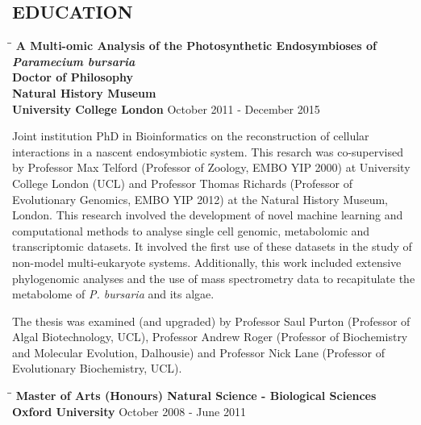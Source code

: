 \documentclass{res}
\begin{document}
\begin{resume}
        
\section{EDUCATION}          

\vspace{-0.05in}
\begin{tabbing}
   \hspace{2in}\= \hspace{2.6in}\= \kill 
   {\bf A Multi-omic Analysis of the Photosynthetic Endosymbioses of \textit{Paramecium bursaria}}\\
    {\bf Doctor of Philosophy}\\ 
    {\bf Natural History Museum}\\
    {\bf University College London
    } \>      \>October 2011 - December 2015\\

   \end{tabbing}\vspace{-20pt}  
   
   Joint institution PhD in Bioinformatics on the reconstruction of cellular interactions in a nascent endosymbiotic system.  This resarch was co-supervised by Professor Max Telford (Professor of Zoology, EMBO YIP 2000) at University College London (UCL) and Professor Thomas Richards (Professor of Evolutionary Genomics, EMBO YIP 2012) at the Natural History Museum, London.  
   This research involved the development of novel machine learning and computational methods
   to analyse single cell genomic, metabolomic and transcriptomic datasets.  
   It involved the first use of these datasets in the study of non-model multi-eukaryote systems.
   Additionally, this work included extensive phylogenomic analyses and the use of 
   mass spectrometry data
   to recapitulate the metabolome of \textit{P. bursaria} and its algae. 

   The thesis was examined (and upgraded) by 
   Professor Saul Purton (Professor of Algal Biotechnology, UCL), Professor Andrew Roger (Professor of Biochemistry and Molecular Evolution, Dalhousie) and Professor Nick Lane (Professor of Evolutionary Biochemistry, UCL).

\vspace{-0.1in}
 \begin{tabbing}
   \hspace{2in}\= \hspace{2.6in}\= \kill 
     {\bf Master of Arts (Honours) Natural Science - Biological Sciences}\\
    {\bf Oxford University
    } \>      \>October 2008 - June 2011\\
                          


\end{tabbing}
\end{resume}
\end{document}
